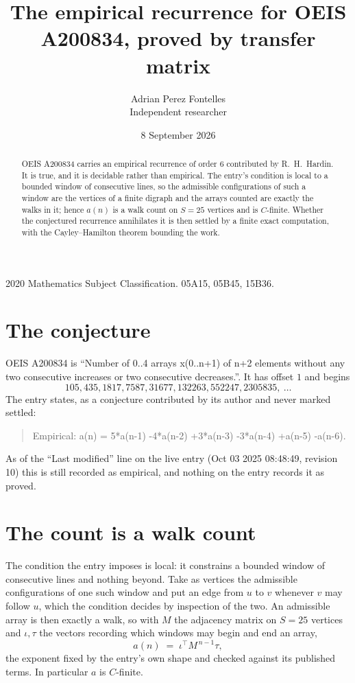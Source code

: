 \documentclass[11pt,a4paper]{article}
\title{The empirical recurrence for OEIS A200834, proved by transfer matrix}
\author{Adrian Perez Fontelles\\ \small Independent researcher}
\date{8 September 2026}
\theoremstyle{plain}
\theoremstyle{definition}
\begin{document}
\maketitle

\begin{abstract}
OEIS A200834 carries an empirical recurrence of order $6$ contributed by R.~H.~Hardin. It is
true, and it is decidable rather than empirical. The entry's condition is local to a bounded window of consecutive lines, so
the admissible configurations of such a window are the vertices of a finite digraph and the
arrays counted are exactly the walks in it; hence $a(n)$ is a walk count on $S=25$ vertices
and is $C$-finite. Whether the conjectured recurrence annihilates it is then settled by a
finite exact computation, with the Cayley--Hamilton theorem bounding the work.
\end{abstract}

\noindent\small 2020 Mathematics Subject Classification. 05A15, 05B45, 15B36.\normalsize

\section{The conjecture}

OEIS A200834 is ``Number of 0..4 arrays x(0..n+1) of n+2 elements without any two consecutive increases or two consecutive decreases.''. It has offset $1$ and begins
\[
105, 435, 1817, 7587, 31677, 132263, 552247, 2305835,\ \dots
\]
The entry states, as a conjecture contributed by its author and never marked settled:
\begin{quote}
Empirical: a(n) = 5*a(n-1) -4*a(n-2) +3*a(n-3) -3*a(n-4) +a(n-5) -a(n-6).
\end{quote}
As of the ``Last modified'' line on the live entry (Oct 03 2025 08:48:49, revision 10) this is still
recorded as empirical, and nothing on the entry records it as proved.

\section{The count is a walk count}

The condition the entry imposes is local: it constrains a bounded window of consecutive lines and nothing beyond. Take as
vertices the admissible configurations of one such window and put an edge from $u$ to $v$
whenever $v$ may follow $u$, which the condition decides by inspection of the two. An
admissible array is then exactly a walk, so with $M$ the adjacency matrix on $S=25$ vertices
and $\iota,\tau$ the vectors recording which windows may begin and end an array,
\[
a(n)\;=\;\iota^{\!\top}M^{\,n-1}\tau ,
\]
the exponent fixed by the entry's own shape and checked against its published terms. In
particular $a$ is $C$-finite.
\end{document}
